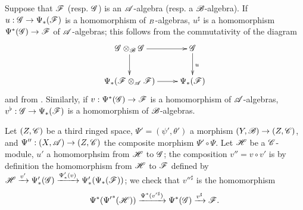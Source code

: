\begin{env}[4.4.7]
\label{0.4.4.7}
Suppose that $\mathscr{F}$ (resp. $\mathscr{G}$) is an $\mathscr{A}$-algebra (resp. a $\mathscr{B}$-algebra). If
$u:\sh{G}\to\Psi_*(\sh{F})$ is a homomorphism of $\sb{B}$-algebras, $u^\sharp$ is a
homomorphism $\Psi^*(\sh{G})\to\sh{F}$ of $\mathscr{A}$-algebras; this follows from the
commutativity of the diagram
\[
  \xymatrix{
    \sh{G}\otimes_\sh{B}\sh{G}\ar[r]\ar[d] &
    \sh{G}\ar[d]^u\\
    \Psi_*(\sh{F}\otimes_\sh{A}\sh{F})\ar[r] &
    \Psi_*(\sh{F})
  }
\]
and from . Similarly, if $v:\Psi^*(\sh{G})\to\sh{F}$ is a homomorphism of
$\mathscr{A}$-algebras, $v^\flat:\sh{G}\to\Psi_*(\sh{F})$ is a homomorphism of $\mathscr{B}$-algebras.
\end{env}

\begin{env}[4.4.8]
\label{0.4.4.8}
Let $(Z,\mathscr{C})$ be a third ringed space, $\Psi'=(\psi',\theta')$ a morphism
$(Y,\sh{B})\to(Z,\sh{C})$, and $\Psi'':(X,\sh{A})\to(Z,\sh{C})$ the composite morphism
$\Psi'\circ\Psi$. Let $\mathscr{H}$ be a $\mathscr{C}$-module, $u'$ a homomorphsim from $\mathscr{H}$ to
$\mathscr{G}$; the composition $v''=v\circ v'$ is by definition the homomorphism from $\mathscr{H}$ to
$\mathscr{F}$ defined by
$\mathscr{H}\xrightarrow{v'}\Psi_*'(\mathscr{G})\xrightarrow{\Psi_*'(v)}\Psi_*'(\Psi_*(\mathscr{F}))$; we
check that ${v''}^\sharp$ is the homomorphism
\[
  \Psi^*({\Psi'}^*(\mathscr{H}))\xrightarrow{\Psi^*({v'}^\sharp)}\Psi^*(\mathscr{G})
  \xrightarrow{v^\sharp}\mathscr{F}.
\]
\end{env}

